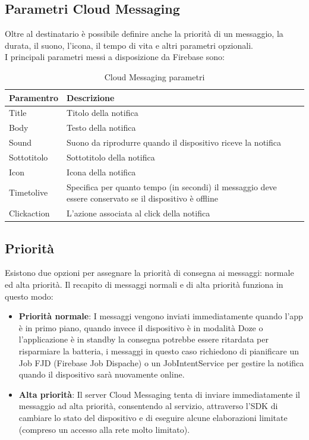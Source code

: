 \subsection{Parametri Cloud Messaging}
Oltre al destinatario è possibile definire anche la priorità di un messaggio, la durata, il suono, l'icona, il tempo di vita e altri parametri opzionali.\\
I principali parametri messi a disposizione da Firebase sono:

\begin{table}[!h]
\begin{center}
\begin{tabular}{|l|p{11cm}|}
\hline
\textbf{Paramentro} & \textbf{Descrizione} \\ \hline
Title &	Titolo della notifica \\   \hline
Body &	Testo della notifica \\   \hline
Sound  &	Suono da riprodurre quando il dispositivo riceve la notifica \\   \hline
Sottotitolo  &	Sottotitolo della notifica \\   \hline
Icon & Icona della notifica \\   \hline
Timetolive & Specifica per quanto tempo (in secondi) il messaggio deve essere conservato se il dispositivo è offline  \\   \hline
Clickaction & L'azione associata al click della notifica \\   \hline

\end{tabular}
\caption[Cloud Messaging paramentri]{Cloud Messaging parametri}\label{tab:Cloud Messaging parametri}
\end{center}
\end{table}

\newpage
\subsection{Priorità}
Esistono due opzioni per assegnare la priorità di consegna ai messaggi: normale ed alta priorità. Il recapito di messaggi normali e di alta priorità funziona in questo modo:
\begin{itemize}
\item  \textbf{Priorità normale}: I messaggi vengono inviati immediatamente quando l'app è in primo piano, quando invece il dispositivo è in modalità Doze o l'applicazione è in standby la consegna potrebbe essere ritardata per risparmiare la batteria, i messaggi in questo caso richiedono di pianificare un Job FJD (Firebase Job Dispache) o un JobIntentService per gestire la notifica quando il dispositivo sarà nuovamente online.
\item \textbf{Alta priorità}: Il server Cloud Messaging tenta di inviare immediatamente il messaggio ad alta priorità, consentendo al servizio, attraverso l'SDK di cambiare lo stato del dispositivo e di eseguire alcune elaborazioni limitate (compreso un accesso alla rete molto limitato).
\end{itemize}





